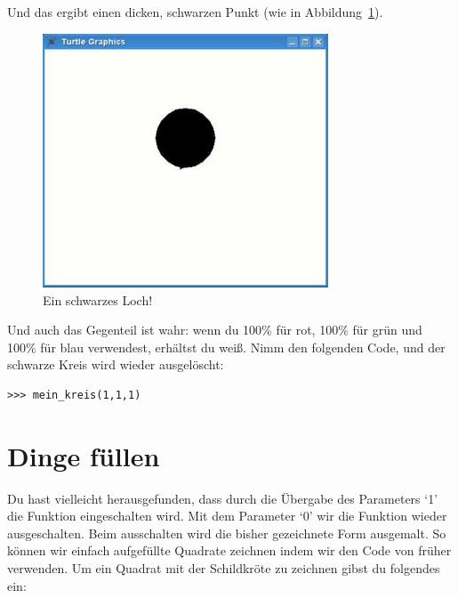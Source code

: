 Und das ergibt einen dicken, schwarzen Punkt (wie in Abbildung~\ref{fig25}).

\begin{figure}
\begin{center}
\includegraphics[width=85mm]{images/figure25}
\end{center}
\caption{Ein schwarzes Loch!}\label{fig25}
\end{figure}

Und auch das Gegenteil ist wahr: wenn du 100\% für rot, 100\% für grün und 100\% für blau verwendest, erhältst du weiß. Nimm den folgenden Code, und der schwarze Kreis wird wieder ausgelöscht:

\begin{Verbatim}[frame=single]
>>> mein_kreis(1,1,1)
\end{Verbatim}

\section{Dinge füllen}

Du hast vielleicht herausgefunden, dass durch die Übergabe des Parameters `1' die  Funktion eingeschalten wird. Mit dem Parameter `0' wir die Funktion wieder ausgeschalten. Beim ausschalten wird die bisher gezeichnete Form ausgemalt. So können wir einfach aufgefüllte Quadrate zeichnen indem wir den Code von früher verwenden. Um ein Quadrat mit der Schildkröte zu zeichnen gibst du folgendes ein:

